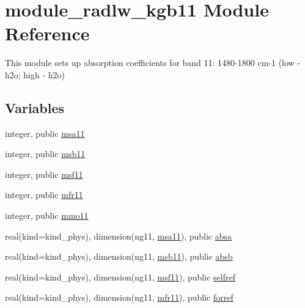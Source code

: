 \hypertarget{namespacemodule__radlw__kgb11}{}\section{module\+\_\+radlw\+\_\+kgb11 Module Reference}
\label{namespacemodule__radlw__kgb11}


This module sets up absorption coefficients for band 11\+: 1480-\/1800 cm-\/1 (low -\/ h2o; high -\/ h2o)  


\subsection*{Variables}
\begin{DoxyCompactItemize}
\item 
integer, public \hyperlink{namespacemodule__radlw__kgb11_afd15a7b87b3d49c53c12e023c604b360}{msa11}
\item 
integer, public \hyperlink{namespacemodule__radlw__kgb11_aa8630868015cb7e358107e6418e35276}{msb11}
\item 
integer, public \hyperlink{namespacemodule__radlw__kgb11_a7dcec9b9f19a3f5f13d443572d834628}{msf11}
\item 
integer, public \hyperlink{namespacemodule__radlw__kgb11_a9b5764441999cce52bc02e65a24420b9}{mfr11}
\item 
integer, public \hyperlink{namespacemodule__radlw__kgb11_a6aabd24aa785ef8689c63b01aaaab243}{mmo11}
\item 
real(kind=kind\+\_\+phys), dimension(ng11, \hyperlink{namespacemodule__radlw__kgb11_afd15a7b87b3d49c53c12e023c604b360}{msa11}), public \hyperlink{namespacemodule__radlw__kgb11_a7ac883387aa86a635c9aea011c55a1d5}{absa}
\item 
real(kind=kind\+\_\+phys), dimension(ng11, \hyperlink{namespacemodule__radlw__kgb11_aa8630868015cb7e358107e6418e35276}{msb11}), public \hyperlink{namespacemodule__radlw__kgb11_acf37465675961812e07616e42b137d70}{absb}
\item 
real(kind=kind\+\_\+phys), dimension(ng11, \hyperlink{namespacemodule__radlw__kgb11_a7dcec9b9f19a3f5f13d443572d834628}{msf11}), public \hyperlink{namespacemodule__radlw__kgb11_ac98edefcce668d56c3aadc241863741f}{selfref}
\item 
real(kind=kind\+\_\+phys), dimension(ng11, \hyperlink{namespacemodule__radlw__kgb11_a9b5764441999cce52bc02e65a24420b9}{mfr11}), public \hyperlink{namespacemodule__radlw__kgb11_a9239d06fcd3fca0f13302c1ae4eb5a60}{forref}

\end{DoxyCompactItemize}
